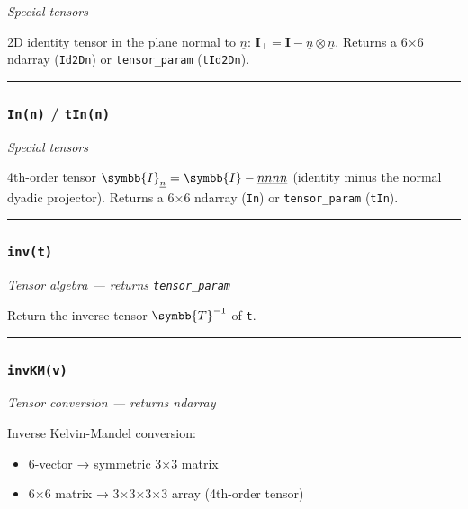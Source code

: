 \documentclass[
  a4paper,
  numbers=noendperiod,
  DIV=12]{scrreprt}
\providecommand{\tightlist}{%
  \setlength{\itemsep}{0pt}\setlength{\parskip}{0pt}}
\newcommand{\uu}[1]{{\symbf{{#1}}}}
\newcommand{\uuuu}[1]{{\symbb{{#1}}}}
\newcommand{\uv}[1]{{\underline{{#1}}}}
\begin{document}
\emph{Special tensors}

2D identity tensor in the plane normal to \(\uv{n}\):
\(\uu{I}_\perp = \uu{I} - \uv{n}\otimes\uv{n}\). Returns a 6×6 ndarray
(\texttt{Id2Dn}) or \texttt{tensor\_param} (\texttt{tId2Dn}).

\begin{center}\rule{0.5\linewidth}{0.5pt}\end{center}

\subsubsection{\texorpdfstring{\texttt{In(n)} /
\texttt{tIn(n)}}{In(n) / tIn(n)}}\label{api-In}

\emph{Special tensors}

4th-order tensor
\(\uuuu{I}_{\uv{n}} = \uuuu{I} - \uv{n}\uv{n}\uv{n}\uv{n}\) (identity
minus the normal dyadic projector). Returns a 6×6 ndarray (\texttt{In})
or \texttt{tensor\_param} (\texttt{tIn}).

\begin{center}\rule{0.5\linewidth}{0.5pt}\end{center}

\subsubsection{\texorpdfstring{\texttt{inv(t)}}{inv(t)}}\label{api-inv}

\emph{Tensor algebra --- returns \texttt{tensor\_param}}

Return the inverse tensor \(\uuuu{T}^{-1}\) of \texttt{t}.

\begin{center}\rule{0.5\linewidth}{0.5pt}\end{center}

\subsubsection{\texorpdfstring{\texttt{invKM(v)}}{invKM(v)}}\label{api-invKM}

\emph{Tensor conversion --- returns ndarray}

Inverse Kelvin-Mandel conversion:

\begin{itemize}
\tightlist
\item
  6-vector → symmetric 3×3 matrix
\item
  6×6 matrix → 3×3×3×3 array (4th-order tensor)
\end{itemize}
\end{document}
